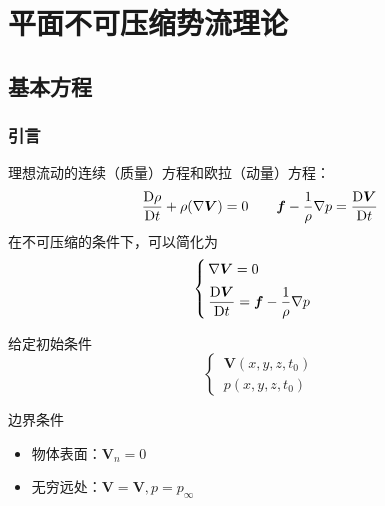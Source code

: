 \chapter{平面不可压缩势流理论}
\thispagestyle{empty}
\section{基本方程}
\subsection{引言}
理想流动的连续（质量）方程和欧拉（动量）方程：
\begin{equation*}
	\dfrac{{\rm{D}} \rho}{{\rm{D}} t} + \rho (\nabla \bm{V}) = 0 \qquad \bm{f} - \dfrac{1}{\rho} \nabla p = \dfrac{{\rm{D}} \bm{V}}{{\rm{D}} t}
\end{equation*}
在不可压缩的条件下，可以简化为
\begin{equation}
	\begin{cases}
		\, \nabla \bm{V} = 0\\[0.5em]
		\, \dfrac{{\rm{D}} \bm{V}}{{\rm{D}} t} = \bm{f} - \dfrac{1}{\rho} \nabla p
	\end{cases}
\end{equation}
\vspace*{0.5em}

\noindent
\begin{minipage}{0.4\linewidth}
	给定初始条件
	\begin{equation*}
		\begin{cases}
			\, \bm{V}(x,y,z,t_0)\\
			\, p(x,y,z,t_0)
		\end{cases}
	\end{equation*}
\end{minipage}
\begin{minipage}{0.6\linewidth}
	边界条件\vspace*{-0.5em}
	\begin{itemize}
		\item 物体表面：$\bm{V}_n = 0$\vspace*{-0.5em}
		\item 无穷远处：$\bm{V} = \bm{V}, p = p_\infty$
	\end{itemize}
\end{minipage}
\vspace*{1em}

